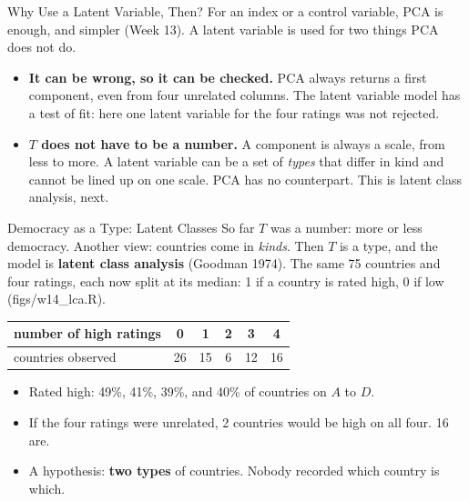 \documentclass[aspectratio=169,11pt,xcolor=dvipsnames]{beamer}
\newcommand{\srcp}[1]{{\scriptsize\color{gray}(#1)}}
\begin{document}
\begin{frame}{Why Use a Latent Variable, Then?}
For an index or a control variable, PCA is enough, and simpler (Week 13). A latent variable is
used for two things PCA does not do.
\begin{itemize}\itemsep10pt
  \item \textbf{It can be wrong, so it can be checked.} PCA always returns a first component, even
        from four unrelated columns. The latent variable model has a test of fit: here one
        latent variable for the four ratings was not rejected.
  \item \textbf{$T$ does not have to be a number.} A component is always a scale, from less to more.
        A latent variable can be a set of \emph{types} that differ in kind and cannot be lined
        up on one scale. PCA has no counterpart. This is latent class analysis, next.
\end{itemize}
\end{frame}

\begin{frame}{Democracy as a Type: Latent Classes}
So far $T$ was a number: more or less democracy. Another view: countries come in \emph{kinds}.
Then $T$ is a type, and the model is \textbf{latent class analysis} (Goodman 1974).
\vskip3pt
The same 75 countries and four ratings, each now split at its median: 1 if a country is rated
high, 0 if low \srcp{figs/w14\_lca.R}.
\begin{center}\small
\renewcommand{\arraystretch}{1.1}
\begin{tabular}{@{}lccccc@{}}
\toprule
number of high ratings & 0 & 1 & 2 & 3 & 4 \\
\midrule
countries observed & 26 & 15 & 6 & 12 & 16 \\
\bottomrule
\end{tabular}
\end{center}
\begin{itemize}\itemsep3pt
  \item Rated high: 49\%, 41\%, 39\%, and 40\% of countries on $A$ to $D$.
  \item If the four ratings were unrelated, 2 countries would be high on all four. 16 are.
  \item A hypothesis: \textbf{two types} of countries. Nobody recorded which country is which.
\end{itemize}
\end{frame}
\end{document}
